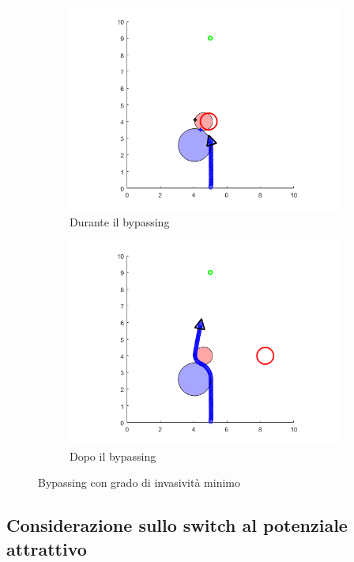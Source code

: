 \documentclass[14pt,a4paper]{extarticle}
\begin{document}
\begin{figure}[H]
\begin{subfigure}[t]{0.5\textwidth}
\centering
\caption{Durante il bypassing}
\includegraphics[width=\textwidth]{hmin_1.png}
\end{subfigure}
\hfill
\begin{subfigure}[t]{0.5\textwidth}
\centering
\caption{Dopo il bypassing}
\includegraphics[width=\textwidth]{hmin_2.png}
\end{subfigure}
\caption{Bypassing con grado di invasività minimo}
\label{hmin}
\end{figure}


\subsection{Considerazione sullo switch al potenziale attrattivo}
\end{document}

